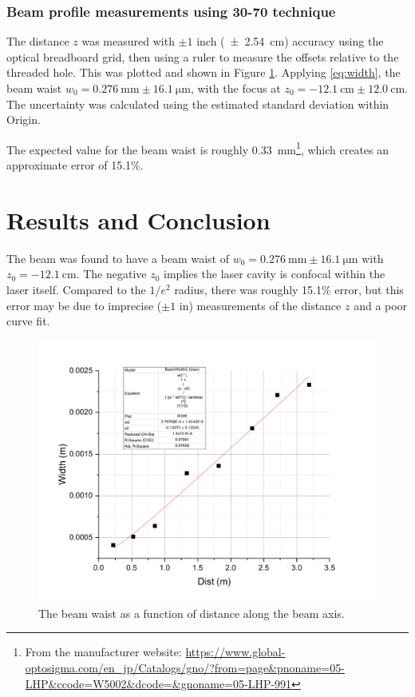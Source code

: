 \documentclass[notitlepage]{report}
\begin{document}
	
	
	\subsubsection{Beam profile measurements using 30-70 technique}
	
	The distance $z$ was measured with $\pm 1$ inch (\SI{\pm 2.54}{\centi\meter}) accuracy using the optical breadboard grid, then using a ruler to measure the offsets relative to the threaded hole. This was plotted and shown in Figure \ref{fig:lab4thing}. Applying \eqref{eq:width}, the beam waist $w_0=\SI{0.276}{\mm} \pm \SI{16.1}{\um}$, with the focus at $z_0=\SI{-12.1}{\centi\meter} \pm \SI{12.0}{\centi\meter}$. The uncertainty was calculated using the estimated standard deviation within Origin.
	
	The expected value for the beam waist is roughly \SI{0.33}{\mm}\footnote{From the manufacturer website:
		 \url{https://www.global-optosigma.com/en\_jp/Catalogs/gno/?from=page\&pnoname=05-LHP\&ccode=W5002\&dcode=\&gnoname=05-LHP-991}}, which creates an approximate error of 15.1\%.
	 
	
	
	
	\section{Results and Conclusion}
	The beam was found to have a beam waist of $w_0=\SI{0.276}{\mm} \pm \SI{16.1}{\um}$ with $z_0=\SI{-12.1}{\centi\meter}$. The negative $z_0$ implies the laser cavity is confocal within the laser itself. Compared to the $1/e^2$ radius, there was roughly 15.1\% error, but this error may be due to imprecise ($\pm 1 \text{ in}$) measurements of the distance $z$ and a poor curve fit. 
	
		\begin{figure}[h]
		\centering
		\includegraphics[width=\linewidth]{lab4_thing}
		\caption{The beam waist as a function of distance along the beam axis.}
		\label{fig:lab4thing}
	\end{figure}
	
\end{document}
